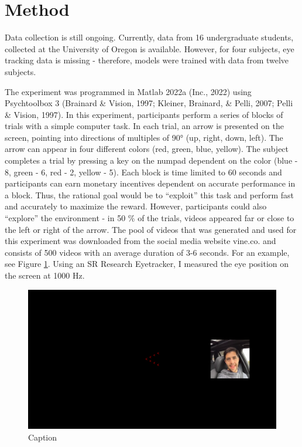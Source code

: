 \documentclass[
  man,floatsintext]{apa6}
\begin{document}
\hypertarget{method}{%
\section{Method}\label{method}}

Data collection is still ongoing. Currently, data from 16 undergraduate students, collected at the University of Oregon is available. However, for four subjects, eye tracking data is missing - therefore, models were trained with data from twelve subjects.

The experiment was programmed in Matlab 2022a (Inc., 2022) using Psychtoolbox 3 (Brainard \& Vision, 1997; Kleiner, Brainard, \& Pelli, 2007; Pelli \& Vision, 1997). In this experiment, participants perform a series of blocks of trials with a simple computer task. In each trial, an arrow is presented on the screen, pointing into directions of multiples of 90° (up, right, down, left). The arrow can appear in four different colors (red, green, blue, yellow). The subject completes a trial by pressing a key on the numpad dependent on the color (blue - 8, green - 6, red - 2, yellow - 5). Each block is time limited to 60 seconds and participants can earn monetary incentives dependent on accurate performance in a block. Thus, the rational goal would be to ``exploit'' this task and perform fast and accurately to maximize the reward. However, participants could also ``explore'' the environment - in 50 \% of the trials, videos appeared far or close to the left or right of the arrow. The pool of videos that was generated and used for this experiment was downloaded from the social media website vine.co. and consists of 500 videos with an average duration of 3-6 seconds. For an example, see Figure \ref{fig:task}. Using an SR Research Eyetracker, I measured the eye position on the screen at 1000 Hz.

\begin{figure}
\centering
\includegraphics{task.png}
\caption{\label{fig:task} Caption}
\end{figure}
\end{document}

